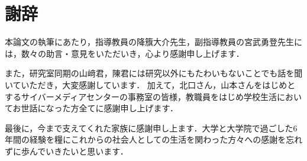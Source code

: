 \chapter{謝辞}
本論文の執筆にあたり，指導教員の降籏大介先生，副指導教員の宮武勇登先生には，数々の助言・意見をいただいき，心より感謝申し上げます．


また，研究室同期の山﨑君，陳君には研究以外にもたわいもないことでも話を聞いていただき，大変感謝しています．
加えて，北口さん，山本さんをはじめとするサイバーメディアセンターの事務室の皆様，教職員をはじめ学校生活においてお世話になった方全てに感謝申し上げます．


最後に，今まで支えてくれた家族に感謝申し上ます．大学と大学院で過ごした6年間の経験を糧にこれからの社会人としての生活を関わった方々への感謝を忘れずに歩んでいきたいと思います．